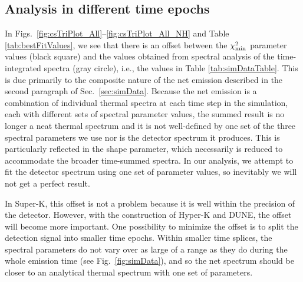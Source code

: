 \documentclass[aps,reprint,superscriptaddress]{revtex4-1}
\begin{document}
\subsection{Analysis in different time epochs}\label{subsec:timeSplit}


In Figs.~\ref{fig:csTriPlot_All}--\ref{fig:csTriPlot_All_NH} and Table \ref{tab:bestFitValues}, we see that there is an offset between the $\chi^{2}_{\rm min}$ parameter values (black square) and the values obtained from spectral analysis of the time-integrated spectra (gray circle), i.e., the values in Table \ref{tab:simDataTable}. This is due primarily to the composite nature of the net emission described in the second paragraph of Sec.~\ref{sec:simData}. Because the net emission is a combination of individual thermal spectra at each time step in the simulation, each with different sets of spectral parameter values, the summed result is no longer a neat thermal spectrum and it is not well-defined by one set of the three spectral parameters we use nor is the detector spectrum it produces.  This is particularly reflected in the shape parameter, which necessarily is reduced to accommodate the broader time-summed spectra. In our analysis, we attempt to fit the detector spectrum using one set of parameter values, so inevitably we will not get a perfect result.

In Super-K, this offset is not a problem because it is well within the precision of the detector. However, with the construction of Hyper-K and DUNE, the offset will become more important. One possibility to minimize the offset is to split the detection signal into smaller time epochs. Within smaller time splices, the spectral parameters do not vary over as large of a range as they do during the whole emission time (see Fig.~\ref{fig:simData}), and so the net spectrum should be closer to an analytical thermal spectrum with one set of parameters.
\end{document}
